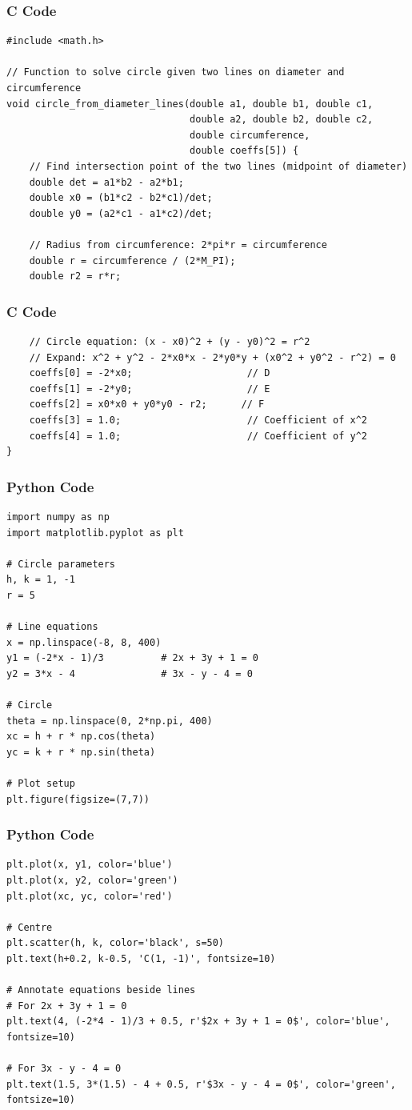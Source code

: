 \documentclass{beamer}
\begin{document}
\begin{frame}[fragile]
    \frametitle{C Code}
\begin{lstlisting}
#include <math.h>

// Function to solve circle given two lines on diameter and circumference
void circle_from_diameter_lines(double a1, double b1, double c1,
                                double a2, double b2, double c2,
                                double circumference,
                                double coeffs[5]) {
    // Find intersection point of the two lines (midpoint of diameter)
    double det = a1*b2 - a2*b1;
    double x0 = (b1*c2 - b2*c1)/det;
    double y0 = (a2*c1 - a1*c2)/det;

    // Radius from circumference: 2*pi*r = circumference
    double r = circumference / (2*M_PI);
    double r2 = r*r;
\end{lstlisting}
\end{frame}

\begin{frame}[fragile]
    \frametitle{C Code}
\begin{lstlisting}
    // Circle equation: (x - x0)^2 + (y - y0)^2 = r^2
    // Expand: x^2 + y^2 - 2*x0*x - 2*y0*y + (x0^2 + y0^2 - r^2) = 0
    coeffs[0] = -2*x0;                    // D
    coeffs[1] = -2*y0;                    // E
    coeffs[2] = x0*x0 + y0*y0 - r2;      // F
    coeffs[3] = 1.0;                      // Coefficient of x^2
    coeffs[4] = 1.0;                      // Coefficient of y^2
}
\end{lstlisting}
\end{frame}

\begin{frame}[fragile]
    \frametitle{Python Code}
\begin{lstlisting}
import numpy as np
import matplotlib.pyplot as plt

# Circle parameters
h, k = 1, -1
r = 5

# Line equations
x = np.linspace(-8, 8, 400)
y1 = (-2*x - 1)/3          # 2x + 3y + 1 = 0
y2 = 3*x - 4               # 3x - y - 4 = 0

# Circle
theta = np.linspace(0, 2*np.pi, 400)
xc = h + r * np.cos(theta)
yc = k + r * np.sin(theta)

# Plot setup
plt.figure(figsize=(7,7))
\end{lstlisting}
\end{frame}

\begin{frame}[fragile]
    \frametitle{Python Code}
\begin{lstlisting}
plt.plot(x, y1, color='blue')
plt.plot(x, y2, color='green')
plt.plot(xc, yc, color='red')

# Centre
plt.scatter(h, k, color='black', s=50)
plt.text(h+0.2, k-0.5, 'C(1, -1)', fontsize=10)

# Annotate equations beside lines 
# For 2x + 3y + 1 = 0
plt.text(4, (-2*4 - 1)/3 + 0.5, r'$2x + 3y + 1 = 0$', color='blue', fontsize=10)

# For 3x - y - 4 = 0
plt.text(1.5, 3*(1.5) - 4 + 0.5, r'$3x - y - 4 = 0$', color='green', fontsize=10)
\end{lstlisting}
\end{frame}
\end{document}
